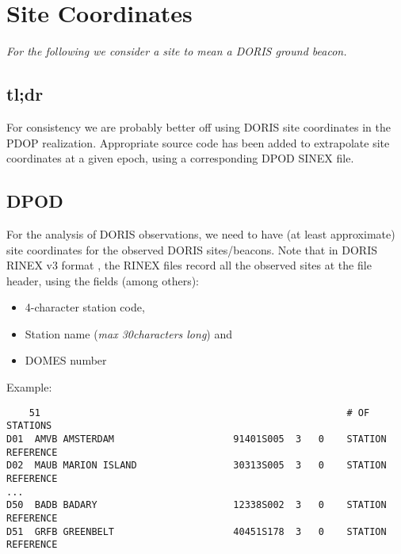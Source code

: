 \chapter{Site Coordinates}
\label{ch:site-coordinates}

\emph{For the following we consider a site to mean a DORIS ground beacon.}

\section{tl;dr}
For consistency we are probably better off using DORIS site coordinates in the PDOP 
realization. Appropriate source code has been added to extrapolate site coordinates 
at a given epoch, using a corresponding DPOD SINEX file.


\section{DPOD}
For the analysis of DORIS observations, we need to have (at least approximate) 
site coordinates for the observed DORIS sites/beacons. Note that in DORIS RINEX 
v3 format \cite{DORISRNX3}, the RINEX files record all the observed sites at the 
file header, using the fields (among others):
\begin{itemize}
    \item 4-character station code,
    \item Station name (\textit{max 30characters long}) and 
    \item DOMES number
\end{itemize}

Example:
\begin{verbatim}
    51                                                      # OF STATIONS
D01  AMVB AMSTERDAM                     91401S005  3   0    STATION REFERENCE
D02  MAUB MARION ISLAND                 30313S005  3   0    STATION REFERENCE
...
D50  BADB BADARY                        12338S002  3   0    STATION REFERENCE 
D51  GRFB GREENBELT                     40451S178  3   0    STATION REFERENCE
\end{verbatim}

